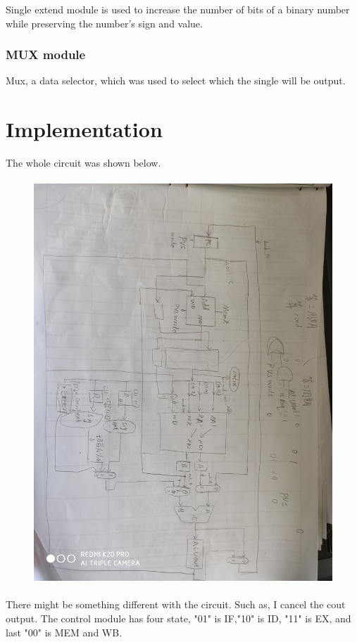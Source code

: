 \documentclass[12pt,a4paper]{article}
\begin{document}
Single extend module is used to increase the number of bits of a binary number while preserving the number's sign and value. 

\subsubsection{MUX module}

Mux, a data selector, which was used to select which the single will be output.

\newpage

\section{Implementation}

The whole circuit was shown below.

\begin{figure}[H]
  \centering
  \includegraphics[height=6in, angle=90]{Lens.jpg}
  \end{figure}

There might be something different with the circuit.
Such as, I cancel the cout output.
The control module has four state, "01" is IF,"10" is ID, "11" is EX, and last "00" is MEM and WB.
\newpage
\end{document}
